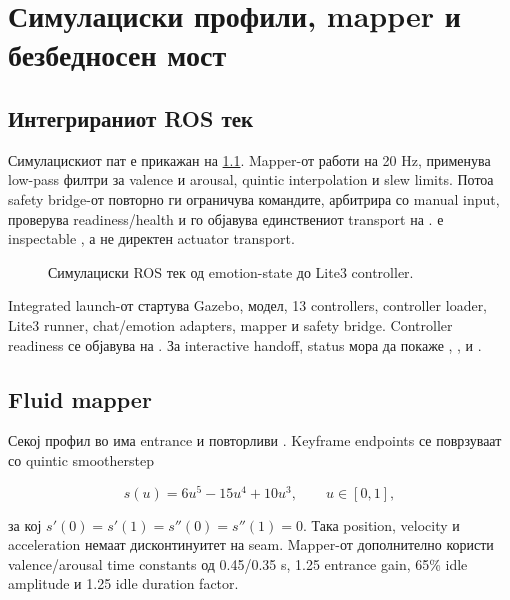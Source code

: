 \chapter{Симулациски профили, mapper и безбедносен мост}
\label{chap:simulation}

\section{Интегрираниот ROS тек}

Симулацискиот пат е прикажан на \cref{fig:simulation-flow}. Mapper-от работи на
20 Hz, применува low-pass филтри за valence и arousal, quintic interpolation и
slew limits. Потоа safety bridge-от повторно ги ограничува командите,
арбитрира со manual input, проверува readiness/health и го објавува
единствениот  transport на
.  е inspectable
, а не директен actuator transport.

\begin{figure}[htbp]
\centering
\resizebox{\textwidth}{!}{}
\caption{Симулациски ROS тек од emotion-state до Lite3 controller.}
\label{fig:simulation-flow}
\end{figure}

Integrated launch-от стартува Gazebo, модел, 13 controllers, controller loader,
Lite3 runner, chat/emotion adapters, mapper и safety bridge. Controller
readiness се објавува на . За
interactive handoff, status мора да покаже
, ,
 и .

\section{Fluid mapper}

Секој профил во  има entrance  и
повторливи . Keyframe endpoints се поврзуваат со quintic
smootherstep

\begin{equation}
  s(u)=6u^5-15u^4+10u^3, \qquad u\in[0,1],
  \label{eq:smootherstep}
\end{equation}

за кој $s'(0)=s'(1)=s''(0)=s''(1)=0$. Така position, velocity и acceleration
немаат дисконтинуитет на seam. Mapper-от дополнително користи valence/arousal
time constants од 0.45/0.35 s, 1.25 entrance gain, 65\% idle amplitude и 1.25
idle duration factor.

